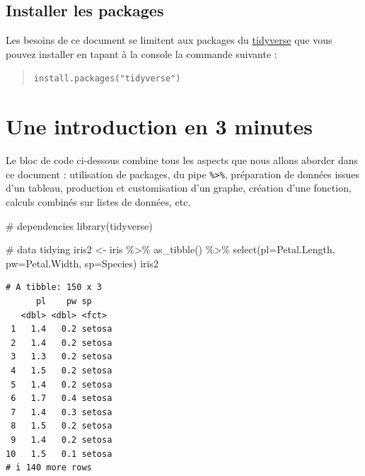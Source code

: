 \documentclass[
  letterpaper,
  DIV=11,
  numbers=noendperiod]{scrreprt}
\newenvironment{Shaded}{\begin{snugshade}}{\end{snugshade}}
\newcommand{\AttributeTok}[1]{\textcolor[rgb]{0.40,0.45,0.13}{#1}}
\newcommand{\CommentTok}[1]{\textcolor[rgb]{0.37,0.37,0.37}{#1}}
\newcommand{\FunctionTok}[1]{\textcolor[rgb]{0.28,0.35,0.67}{#1}}
\newcommand{\NormalTok}[1]{\textcolor[rgb]{0.00,0.23,0.31}{#1}}
\newcommand{\OtherTok}[1]{\textcolor[rgb]{0.00,0.23,0.31}{#1}}
\newcommand{\SpecialCharTok}[1]{\textcolor[rgb]{0.37,0.37,0.37}{#1}}
\begin{document}
\hypertarget{installer-les-packages}{%
\section{Installer les packages}\label{installer-les-packages}}

Les besoins de ce document se limitent aux packages du
\href{https://www.tidyverse.org/}{tidyverse} que vous pouvez installer
en tapant à la console la commande suivante :

\begin{quote}
\texttt{install.packages("tidyverse")}
\end{quote}


\hypertarget{une-introduction-en-3-minutes}{%
\chapter{Une introduction en 3
minutes}\label{une-introduction-en-3-minutes}}

Le bloc de code ci-dessous combine tous les aspects que nous allons
aborder dans ce document : utilisation de packages, du pipe
\texttt{\%\textgreater{}\%}, préparation de données issues d'un tableau,
production et customisation d'un graphe, création d'une fonction,
calculs combinés sur listes de données, etc.

\begin{Shaded}
\begin{Highlighting}[]
\CommentTok{\# dependencies}
\FunctionTok{library}\NormalTok{(tidyverse)}

\CommentTok{\# data tidying}
\NormalTok{iris2 }\OtherTok{\textless{}{-}}\NormalTok{ iris }\SpecialCharTok{\%\textgreater{}\%} 
  \FunctionTok{as\_tibble}\NormalTok{() }\SpecialCharTok{\%\textgreater{}\%} 
  \FunctionTok{select}\NormalTok{(}\AttributeTok{pl=}\NormalTok{Petal.Length, }\AttributeTok{pw=}\NormalTok{Petal.Width, }\AttributeTok{sp=}\NormalTok{Species)}
\NormalTok{iris2}
\end{Highlighting}
\end{Shaded}

\begin{verbatim}
# A tibble: 150 x 3
      pl    pw sp    
   <dbl> <dbl> <fct> 
 1   1.4   0.2 setosa
 2   1.4   0.2 setosa
 3   1.3   0.2 setosa
 4   1.5   0.2 setosa
 5   1.4   0.2 setosa
 6   1.7   0.4 setosa
 7   1.4   0.3 setosa
 8   1.5   0.2 setosa
 9   1.4   0.2 setosa
10   1.5   0.1 setosa
# i 140 more rows
\end{verbatim}
\end{document}
